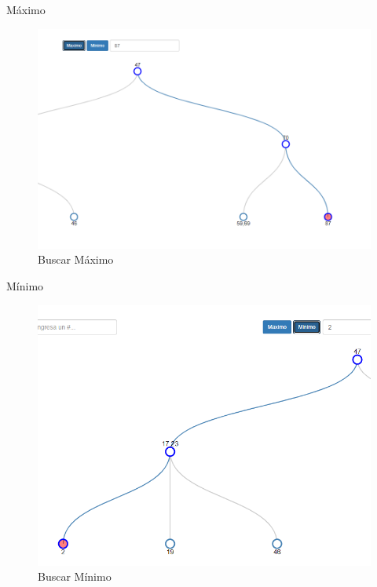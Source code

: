 \documentclass[11pt]{beamer}
\begin{document}
		\begin{frame}{Máximo}
			\justifying
			\begin{figure}[H]
				\centering
				\includegraphics[scale=0.35]{img/btree_bus_2.png}
				\caption{Buscar Máximo}
				\label{fig:btree_bus_2}
			\end{figure}
		\end{frame}
		
		\begin{frame}{Mínimo}
			\justifying
			\begin{figure}[H]
				\centering
				\includegraphics[scale=0.35]{img/btree_bus_3.png}
				\caption{Buscar Mínimo}
				\label{fig:btree_bus_3}
			\end{figure}
		\end{frame}
		
\end{document}
